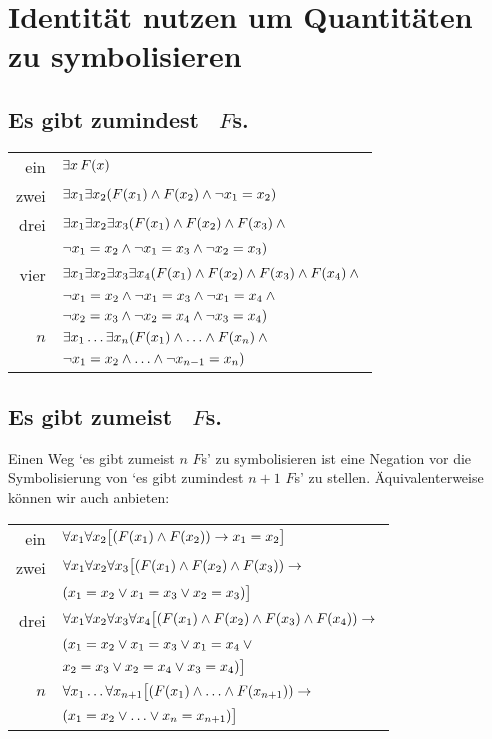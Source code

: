 
\newpage
\section{Identität nutzen um Quantitäten zu symbolisieren}

\subsection*{Es gibt zumindest \blank\ $F$s.}
\label{summary.atleast}

\begin{tabular*}{\textwidth}{rl}
ein & $\exists x\,\mathord{F}(x)$\\
zwei & $\exists x_1\exists x_2(\mathord{F}(x_1) \wedge \mathord{F}(x_2) \wedge \neg x_1  = x_2)$\\
drei & $\exists x_1\exists x_2\exists x_3(\mathord{F}(x_1) \wedge \mathord{F}(x_2) \wedge \mathord{F}(x_3) \wedge {}$\\
& $\neg x_1 = x_2 \wedge\neg x_1 = x_3 \wedge \neg x_2 = x_3)$\\
vier & $\exists x_1\exists x_2\exists x_3\exists x_4 (\mathord{F}(x_1) \wedge \mathord{F}(x_2) \wedge \mathord{F}(x_3) \wedge \mathord{F}(x_4) \wedge {}$\\
& $\neg x_1 = x_2 \wedge \neg x_1 = x_3 \wedge \neg x_1 = x_4 \wedge {}$\\
& $ \neg x_2 = x_3 \wedge \neg x_2 = x_4 \wedge \neg x_3 = x_4)$\\
$n$ & $\exists x_1\ldots\exists x_n(\mathord{F}(x_1) \wedge \ldots \wedge \mathord{F}(x_n) \wedge {}$\\
& $\neg x_1 = x_2 \wedge\ldots\wedge \neg x_{n-1} = x_n)$ 
\end{tabular*}

\subsection*{Es gibt zumeist \blank\ $F$s.}
\label{summary.atmost}

Einen Weg `es gibt zumeist $n$ $F$s' zu symbolisieren ist eine Negation vor die Symbolisierung von `es gibt zumindest $n+1$ $F$s' zu stellen. Äquivalenterweise können wir auch anbieten:
\begin{tabular*}{\textwidth}{rl}
ein & $\forall x_1\forall x_2\bigl[(\mathord{F}(x_1) \wedge \mathord{F}(x_2)) \rightarrow x_1=x_2\bigr]$\\
zwei & $\forall x_1\forall x_2\forall x_3\bigl[(\mathord{F}(x_1) \wedge \mathord{F}(x_2) \wedge \mathord{F}(x_3)) \rightarrow {}$\\ & $(x_1=x_2 \vee x_1=x_3 \vee x_2=x_3)\bigr]$\\
drei & $\forall x_1\forall x_2\forall x_3\forall x_4\bigl[(\mathord{F}(x_1) \wedge \mathord{F}(x_2) \wedge \mathord{F}(x_3) \wedge \mathord{F}(x_4)) \rightarrow {}$\\
& $(x_1=x_2 \vee x_1=x_3 \vee x_1=x_4 \vee {}$\\
& $x_2=x_3 \vee x_2=x_4 \vee x_3=x_4)\bigr]$\\
$n$ & $\forall x_1\ldots\forall x_{n+1}
\bigl[(\mathord{F}(x_1) \wedge \ldots \wedge \mathord{F}(x_{n+1})) \rightarrow {}$\\
& $(x_1=x_2 \vee \ldots \vee x_n=x_{n+1})\bigr]$ 
\end{tabular*}


